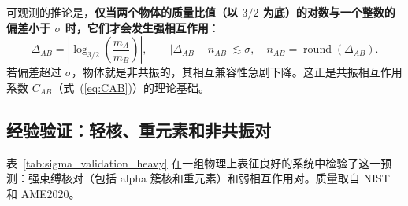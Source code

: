 \documentclass[11pt,a4paper]{article}
\theoremstyle{remark}
\begin{document}
	可观测的推论是，\textbf{仅当两个物体的质量比值（以 \(3/2\) 为底）的对数与一个整数的偏差小于 \(\sigma\) 时，它们才会发生强相互作用}：
	\begin{equation}
		\Delta_{AB} = \left| \log_{3/2}\!\left(\frac{m_A}{m_B}\right) \right|,\qquad |\Delta_{AB} - n_{AB}| \lesssim \sigma,\quad n_{AB} = \operatorname{round}(\Delta_{AB}).
	\end{equation}
	若偏差超过 \(\sigma\)，物体就是非共振的，其相互兼容性急剧下降。这正是共振相互作用系数 \(C_{AB}\)（式~(\ref{eq:CAB})）的理论基础。
	
	\subsection{经验验证：轻核、重元素和非共振对}
	
	表~\ref{tab:sigma_validation_heavy} 在一组物理上表征良好的系统中检验了这一预测：强束缚核对（包括 alpha 簇核和重元素）和弱相互作用对。质量取自 NIST 和 AME2020。
	
\end{document}
